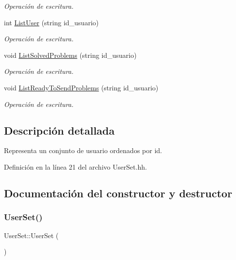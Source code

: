\begin{DoxyCompactItemize}
\begin{DoxyCompactList}\small\item\em Operación de escritura. \end{DoxyCompactList}\item 
int \mbox{\hyperlink{class_user_set_a2087d9597ff9ce03ff471157040fac88}{List\+User}} (string id\+\_\+usuario)
\begin{DoxyCompactList}\small\item\em Operación de escritura. \end{DoxyCompactList}\item 
void \mbox{\hyperlink{class_user_set_afa40c2da0d1a67c7d7d6750e4e9cd78d}{List\+Solved\+Problems}} (string id\+\_\+usuario)
\begin{DoxyCompactList}\small\item\em Operación de escritura. \end{DoxyCompactList}\item 
void \mbox{\hyperlink{class_user_set_a52e8ebe8033813cf5ad7d8b23d7eea4c}{List\+Ready\+To\+Send\+Problems}} (string id\+\_\+usuario)
\begin{DoxyCompactList}\small\item\em Operación de escritura. \end{DoxyCompactList}\end{DoxyCompactItemize}


\subsection{Descripción detallada}
Representa un conjunto de usuario ordenados por id. 

Definición en la línea 21 del archivo User\+Set.\+hh.



\subsection{Documentación del constructor y destructor}
\mbox{\label{class_user_set_a1fcb7215d45571e0f9c4cf4f20b05c80}} 
\subsubsection{\texorpdfstring{User\+Set()}{UserSet()}}
{\footnotesize\ttfamily User\+Set\+::\+User\+Set (\begin{DoxyParamCaption}{ }\end{DoxyParamCaption})}



